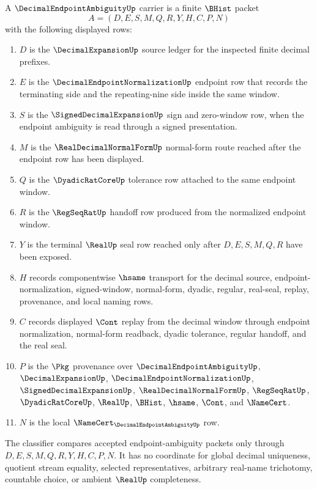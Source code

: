 \begin{definition}
\label{def:decimal-endpoint-ambiguity-carrier}
A $\DecimalEndpointAmbiguityUp$ carrier is a finite $\BHist$ packet
$$
A=(D,E,S,M,Q,R,Y,H,C,P,N)
$$
with the following displayed rows:
\begin{enumerate}
\item $D$ is the $\DecimalExpansionUp$ source ledger for the inspected
  finite decimal prefixes.
\item $E$ is the $\DecimalEndpointNormalizationUp$ endpoint row that records
  the terminating side and the repeating-nine side inside the same window.
\item $S$ is the $\SignedDecimalExpansionUp$ sign and zero-window row, when
  the endpoint ambiguity is read through a signed presentation.
\item $M$ is the $\RealDecimalNormalFormUp$ normal-form route reached after
  the endpoint row has been displayed.
\item $Q$ is the $\DyadicRatCoreUp$ tolerance row attached to the same
  endpoint window.
\item $R$ is the $\RegSeqRatUp$ handoff row produced from the normalized
  endpoint window.
\item $Y$ is the terminal $\RealUp$ seal row reached only after $D,E,S,M,Q,R$
  have been exposed.
\item $H$ records componentwise $\hsame$ transport for the decimal source,
  endpoint-normalization, signed-window, normal-form, dyadic, regular,
  real-seal, replay, provenance, and local naming rows.
\item $C$ records displayed $\Cont$ replay from the decimal window through
  endpoint normalization, normal-form readback, dyadic tolerance, regular
  handoff, and the real seal.
\item $P$ is the $\Pkg$ provenance over $\DecimalEndpointAmbiguityUp$,
  $\DecimalExpansionUp$, $\DecimalEndpointNormalizationUp$,
  $\SignedDecimalExpansionUp$, $\RealDecimalNormalFormUp$, $\RegSeqRatUp$,
  $\DyadicRatCoreUp$, $\RealUp$, $\BHist$, $\hsame$, $\Cont$, and
  $\NameCert$.
\item $N$ is the local $\NameCert_{\DecimalEndpointAmbiguityUp}$ row.
\end{enumerate}
The classifier compares accepted endpoint-ambiguity packets only through
$D,E,S,M,Q,R,Y,H,C,P,N$. It has no coordinate for global decimal uniqueness,
quotient stream equality, selected representatives, arbitrary real-name
trichotomy, countable choice, or ambient $\RealUp$ completeness.
\end{definition}

